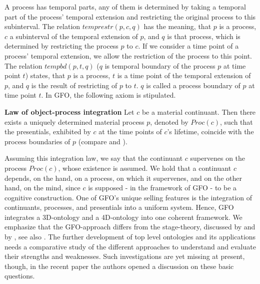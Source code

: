 \documentclass{ao2e}
\begin{document}
{A process has temporal parts, any of them is determined by taking a temporal part of the process' temporal extension and restricting the original process to this subinterval. The relation $temprestr(p,c,q)$ has the meaning, that $p$ is a process, $c$ a subinterval of the temporal extension of $p$, and $q$ is that process, which is determined by restricting the process $p$ to $c$. If we consider a time point of a process' temporal extension, we allow the restriction of the process to this point. The relation $tempbd(p,t,q)$ ($q$ is temporal boundary of the process $p$ at time point $t$) states, that $p$ is a process, $t$ is a time point of the temporal extension of $p$, and $q$ is the result of restricting of $p$ to $t$. $q$ is called a process boundary of $p$ at time point $t$. In GFO, the following axiom is stipulated.

{\bf Law of object-process integration}
Let $c$ be a material continuant. Then there exists a uniquely determined material process $p$, denoted by $Proc(c)$, such that the presentials, exhibited by $c$ at the time points of $c$'s lifetime, coincide with the process boundaries of $p$ (compare \cite{herre-h-2010-a} and \cite{herre-h-2007-a}).

Assuming this integration law, we say that the continuant $c$ supervenes on the process $Proc(c)$, whose existence is assumed. We hold that a continuant $c$ depends, on the hand, on a process, on which it supervenes, and on the other hand, on the mind, since $c$ is supposed - in the framework of GFO - to be a cognitive construction. One of GFO's unique selling features is the integration of continuants, processes, and presentials into a uniform system. Hence, GFO integrates a 3D-ontology and a 4D-ontology into one coherent framework. We emphasize that the GFO-approach differs from the stage-theory, discussed by \cite{sider-t-2001-a} and by \cite{lewis-d-1986-a}, see also \cite{heller-b-2004-a}. The further development of top level ontologies and its applications needs a comparative study of the different approaches to understand and evaluate their strengths and weaknesses. Such investigations are yet missing at present, though, in the recent paper \cite{maojo-v-2011-a} the authors
opened a discussion on these basic questions. 

}
\end{document}
